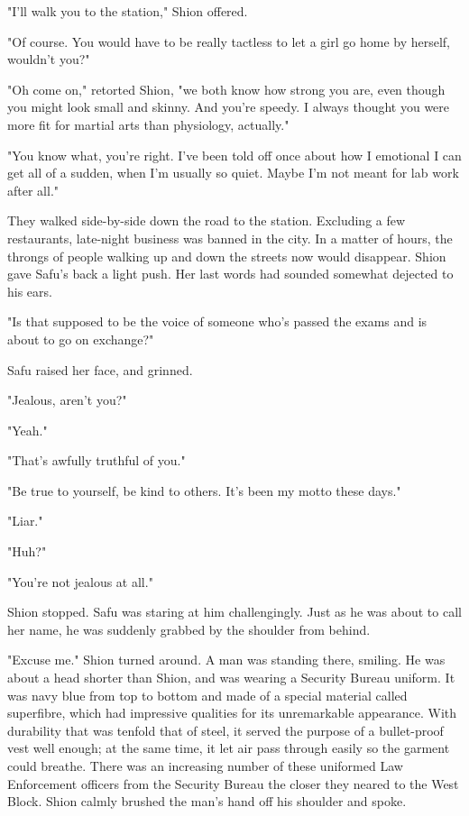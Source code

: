 "I'll walk you to the station," Shion offered.

"Of course. You would have to be really tactless to let a girl go home
by herself, wouldn't you?"

"Oh come on," retorted Shion, "we both know how strong you are, even
though you might look small and skinny. And you're speedy. I always
thought you were more fit for martial arts than physiology, actually."

"You know what, you're right. I've been told off once about how I
emotional I can get all of a sudden, when I'm usually so quiet. Maybe
I'm not meant for lab work after all."

They walked side-by-side down the road to the station. Excluding a few
restaurants, late-night business was banned in the city. In a matter of
hours, the throngs of people walking up and down the streets now would
disappear. Shion gave Safu's back a light push. Her last words had
sounded somewhat dejected to his ears.

"Is that supposed to be the voice of someone who's passed the exams and
is about to go on exchange?"

Safu raised her face, and grinned.

"Jealous, aren't you?"

"Yeah."

"That's awfully truthful of you."

"Be true to yourself, be kind to others. It's been my motto these days."

"Liar."

"Huh?"

"You're not jealous at all."

Shion stopped. Safu was staring at him challengingly. Just as he was
about to call her name, he was suddenly grabbed by the shoulder from
behind.

"Excuse me." Shion turned around. A man was standing there, smiling. He
was about a head shorter than Shion, and was wearing a Security Bureau
uniform. It was navy blue from top to bottom and made of a special
material called superfibre, which had impressive qualities for its
unremarkable appearance. With durability that was tenfold that of steel,
it served the purpose of a bullet-proof vest well enough; at the same
time, it let air pass through easily so the garment could breathe. There
was an increasing number of these uniformed Law Enforcement officers
from the Security Bureau the closer they neared to the West Block. Shion
calmly brushed the man's hand off his shoulder and spoke.

